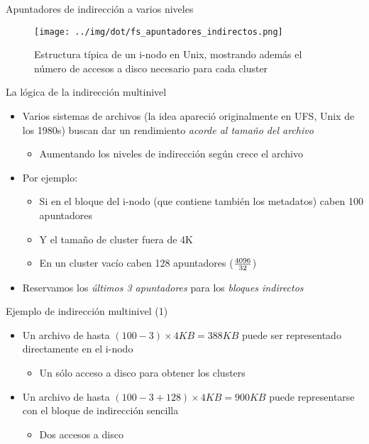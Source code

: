 \documentclass[presentation]{beamer}
\begin{document}
\begin{frame}[label={sec:orgdef2ee1}]{Apuntadores de indirección a varios niveles}
\begin{figure}[htbp]
\centering
\texttt{[image: ../img/dot/fs\_apuntadores\_indirectos.png]}
\caption{Estructura típica de un i-nodo en Unix, mostrando además el número de accesos a disco necesario para cada cluster}
\end{figure}
\end{frame}

\begin{frame}[label={sec:org19b817c}]{La lógica de la indirección multinivel}
\begin{itemize}
\item Varios sistemas de archivos (la idea apareció originalmente en UFS,
Unix de los 1980s) buscan dar un rendimiento \emph{acorde al tamaño del
archivo}
\begin{itemize}
\item Aumentando los niveles de indirección según crece el archivo
\end{itemize}
\item Por ejemplo:
\begin{itemize}
\item Si en el bloque del i-nodo (que contiene también los metadatos)
caben 100 apuntadores
\item Y el tamaño de cluster fuera de 4K
\item En un cluster vacío caben 128 apuntadores (\(4096 \over 32\))
\end{itemize}
\item Reservamos los \emph{últimos 3 apuntadores} para los \emph{bloques indirectos}
\end{itemize}
\end{frame}

\begin{frame}[label={sec:org2541f57}]{Ejemplo de indirección multinivel (1)}
\begin{itemize}
\item Un archivo de hasta \((100-3) \times 4KB = 388KB\) puede
ser representado directamente en el i-nodo
\begin{itemize}
\item Un sólo acceso a disco para obtener los clusters
\end{itemize}
\item Un archivo de hasta \((100-3 + 128) \times 4KB = 900KB\) puede
representarse con el bloque de indirección sencilla
\begin{itemize}
\item Dos accesos a disco
\end{itemize}
\end{itemize}
\end{frame}
\end{document}
